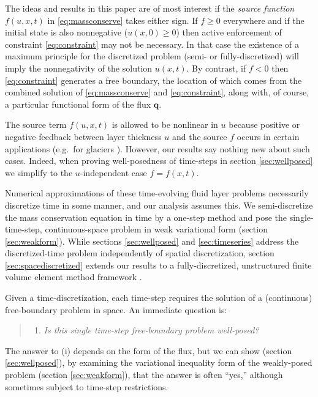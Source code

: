 \documentclass[final,leqno,onefignum,onetabnum]{siamltex1213bueler}
\newcommand\bq{\mathbf{q}}
\begin{document}
The ideas and results in this paper are of most interest if the \emph{source function} $f(u,x,t)$ in \eqref{eq:massconserve} takes either sign.  If $f\ge 0$ everywhere and if the initial state is also nonnegative ($u(x,0)\ge 0$) then active enforcement of constraint \eqref{eq:constraint} may not be necessary.  In that case the existence of a maximum principle for the discretized problem (semi- or fully-discretized) will imply the nonnegativity of the solution $u(x,t)$.  By contrast, if $f<0$ then \eqref{eq:constraint} generates a free boundary, the location of which comes from the combined solution of \eqref{eq:massconserve} and \eqref{eq:constraint}, along with, of course, a particular functional form of the flux $\bq$.

The source term $f(u,x,t)$ is allowed to be nonlinear in $u$ because positive or negative feedback between layer thickness $u$ and the source $f$ occurs in certain applications (e.g.~for glaciers \cite{Jouvetetal2011}).  However, our results say nothing new about such cases.  Indeed, when proving well-posedness of time-steps in section \ref{sec:wellposed} we simplify to the $u$-independent case $f=f(x,t)$.

Numerical approximations of these time-evolving fluid layer problems necessarily discretize time in some manner, and our analysis assumes this.  We semi-discretize the mass conservation equation in time by a one-step method and pose the single-time-step, continuous-space problem in weak variational form (section \ref{sec:weakform}).  While sections \ref{sec:wellposed} and \ref{sec:timeseries} address the discretized-time problem independently of spatial discretization, section \ref{sec:spacediscretized} extends our results to a fully-discretized, unstructured finite volume element method framework \cite{Cai1990}.

Given a time-discretization, each time-step requires the solution of a (continuous) free-boundary problem in space.  An immediate question is:
  \begin{quote}
  \renewcommand{\labelenumi}{(\roman{enumi})}
  \begin{enumerate}
  \item \emph{Is this single time-step free-boundary problem well-posed?}
  \end{enumerate}
  \end{quote}
The answer to (i) depends on the form of the flux, but we can show (section \ref{sec:wellposed}), by examining the variational inequality form of the weakly-posed problem (section \ref{sec:weakform}), that the answer is often ``yes,'' although sometimes subject to time-step restrictions.
\end{document}
